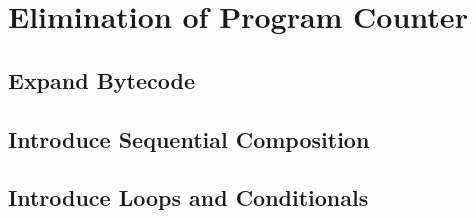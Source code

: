 \section{Elimination of Program Counter}

\subsection{Expand Bytecode}

\PCExpansionRule*

\HandleInstructionRefinementRule*

\subsection{Introduce Sequential Composition}

\SequenceIntroductionRule*

\subsection{Introduce Loops and Conditionals}

\IfConditionalIntroductionRule*

